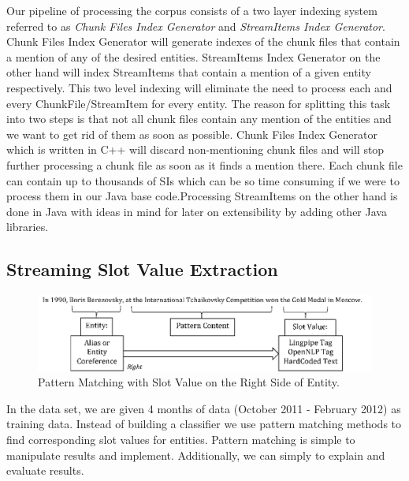 Our pipeline of processing the corpus consists of a two layer indexing system 
referred to as \textit{Chunk Files Index Generator} and \textit{StreamItems Index Generator}.
Chunk Files Index Generator will generate indexes of the chunk files 
that contain a mention of any of the desired entities. StreamItems Index Generator 
on the other hand will index StreamItems that contain a mention of a given entity 
respectively. This two level indexing will eliminate the need to process each and 
every ChunkFile/StreamItem for every entity. The reason for splitting this task 
into two steps is that not all chunk files contain any mention of the entities and 
we want to get rid of them as soon as possible. Chunk Files Index Generator which 
is written in C++ will discard non-mentioning chunk files and will stop further 
processing a chunk file as soon as it finds a mention there. Each chunk file can 
contain up to thousands of SIs which can be so time consuming if we were to 
process them in our Java base code.Processing StreamItems on the other hand is 
done in Java with ideas in mind for later on extensibility by adding other Java libraries.



\subsection{Streaming Slot Value Extraction}
\label{sec:ssve}
\begin{figure}
\centering
\includegraphics[width=6in]{./images/Pattern-eps-converted-to.pdf}
\vspace*{-.1in} \caption{Pattern Matching with Slot Value on the Right Side of Entity. }\label{fig:pattern}
\vspace*{-.2in}
\end{figure}

In the data set, we are given 4 months of data (October 2011 - February 2012) as training data.
Instead of building a classifier we use pattern matching methods to find
corresponding slot values for entities. 
Pattern matching is simple to manipulate results and implement.
Additionally, we can simply to explain and evaluate results.


